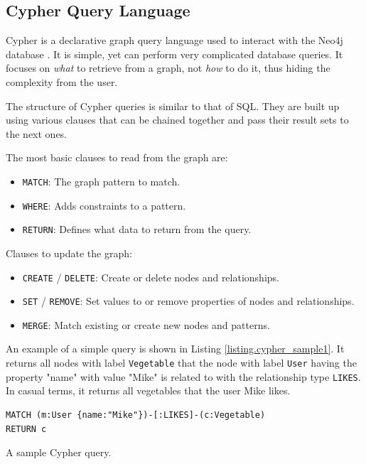 \documentclass[12pt]{report}
\begin{document}
\subsection{Cypher Query Language}

Cypher is a declarative graph query language used to interact with the Neo4j database \cite{neo4j}. It is simple, yet can perform very complicated database queries. It focuses on \textit{what} to retrieve from a graph, not \textit{how} to do it, thus hiding the complexity from the user.

The structure of Cypher queries is similar to that of SQL. They are built up using various clauses that can be chained together and pass their result sets to the next ones.

The most basic clauses to read from the graph are:
\begin{itemize}
\item \texttt{MATCH}: The graph pattern to match.
\item \texttt{WHERE}: Adds constraints to a pattern.
\item \texttt{RETURN}: Defines what data to return from the query.
\end{itemize}

Clauses to update the graph:
\begin{itemize}
\item \texttt{CREATE} / \texttt{DELETE}: Create or delete nodes and relationships.
\item \texttt{SET} / \texttt{REMOVE}: Set values to or remove properties of nodes and relationships. 
\item \texttt{MERGE}: Match existing or create new nodes and patterns.
\end{itemize}

An example of a simple query is shown in Listing \ref{listing.cypher_sample1}. It returns all nodes with label \texttt{Vegetable} that the node with label \texttt{User} having the property "name" with value "Mike" is related to with the relationship type \texttt{LIKES}. In casual terms, it returns all vegetables that the user Mike likes.

\begin{listing}
\begin{verbatim}
MATCH (m:User {name:"Mike"})-[:LIKES]-(c:Vegetable)
RETURN c
\end{verbatim}
\caption{A sample Cypher query.}
\label{listing.cypher_sample1}
\end{listing}
\end{document}
